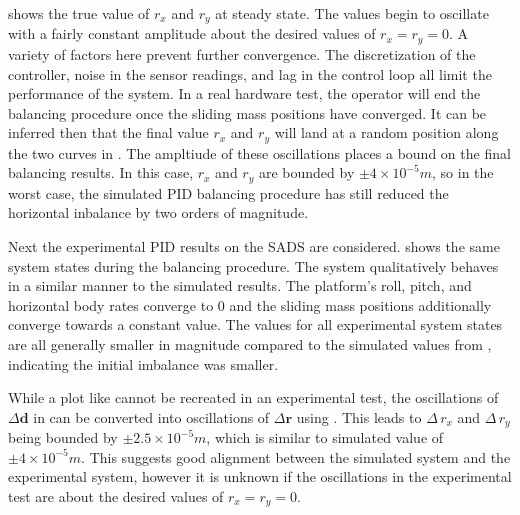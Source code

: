  shows the true value of $r_x$ and $r_y$ at steady state. The values begin to oscillate with a fairly constant amplitude about the desired values of $r_x = r_y = 0$. A variety of factors here prevent further convergence. The discretization of the controller, noise in the sensor readings, and lag in the control loop all limit the performance of the system. In a real hardware test, the operator will end the balancing procedure once the sliding mass positions have converged. It can be inferred then that the final value $r_x$ and $r_y$ will land at a random position along the two curves in . The ampltiude of these oscillations places a bound on the final balancing results. In this case, $r_x$ and $r_y$ are bounded by $\pm4\times10^{-5}m$, so in the worst case, the simulated PID balancing procedure has still reduced the horizontal inbalance by two orders of magnitude.

Next the experimental PID results on the SADS are considered.  shows the same system states during the balancing procedure. The system qualitatively behaves in a similar manner to the simulated results. The platform's roll, pitch, and horizontal body rates converge to 0 and the sliding mass positions additionally converge towards a constant value. The values for all experimental system states are all generally smaller in magnitude compared to the simulated values from , indicating the initial imbalance was smaller.  

While a plot like  cannot be recreated in an experimental test, the oscillations of $\Delta\bm{d}$ in  can be converted into oscillations of $\Delta\bm{r}$ using . This leads to $\Delta\,r_x$ and $\Delta\,r_y$ being bounded by $\pm2.5\times10^{-5}m$, which is similar to simulated value of $\pm4\times10^{-5}m$. This suggests good alignment between the simulated system and the experimental system, however it is unknown if the oscillations in the experimental test are about the desired values of $r_x = r_y = 0$.




